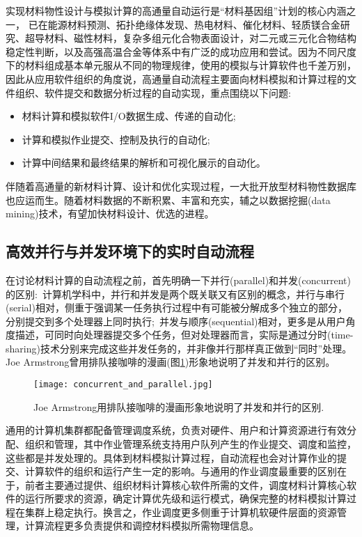 实现材料物性设计与模拟计算的高通量自动运行是“材料基因组”计划的核心内涵之一， 已在能源材料预测、拓扑绝缘体发现、热电材料、催化材料、轻质镁合金研究、超导材料、磁性材料，复杂多组元化合物表面设计，对二元或三元化合物结构稳定性判断，以及高强高温合金等体系中有广泛的成功应用和尝试。因为不同尺度下的材料组成基本单元服从不同的物理规律，使用的模拟与计算软件也千差万别，因此从应用软件组织的角度说，高通量自动流程主要面向材料模拟和计算过程的文件组织、软件提交和数据分析过程的自动实现，重点围绕以下问题:~
\begin{itemize}
	\item 材料计算和模拟软件\textrm{I/O}数据生成、传递的自动化;
	\item 计算和模拟作业提交、控制及执行的自动化;
	\item 计算中间结果和最终结果的解析和可视化展示的自动化。
\end{itemize}
伴随着高通量的新材料计算、设计和优化实现过程，一大批开放型材料物性数据库也应运而生。随着材料数据的不断积累、丰富和充实，辅之以数据挖掘(\textrm{data mining})技术，有望加快材料设计、优选的进程。

\subsection{高效并行与并发环境下的实时自动流程}
在讨论材料计算的自动流程之前，首先明确一下并行(\textrm{parallel})和并发(\textrm{concurrent})的区别:~计算机学科中，并行和并发是两个既关联又有区别的概念，并行与串行(\textrm{serial})相对，侧重于强调某一任务执行过程中有可能被分解成多个独立的部分，分别提交到多个处理器上同时执行;~并发与顺序(\textrm{sequential})相对，更多是从用户角度描述，可同时向处理器提交多个任务，但对处理器而言，实际是通过分时(\textrm{time-sharing})技术分别来完成这些并发任务的，并非像并行那样真正做到“同时”处理。\textrm{ Joe Armstrong}曾用排队接咖啡的漫画(图\ref{Fig:Current_and_Parallel})形象地说明了并发和并行的区别。
\begin{figure}[h!]
\centering
\texttt{[image: concurrent\_and\_parallel.jpg]}%
\caption{\textrm{Joe Armstrong}用排队接咖啡的漫画形象地说明了并发和并行的区别.}%
\label{Fig:Current_and_Parallel}
\end{figure}

通用的计算机集群都配备管理调度系统，负责对硬件、用户和计算资源进行有效分配、组织和管理，其中作业管理系统支持用户队列产生的作业提交、调度和监控，这些都是并发处理的。具体到材料模拟计算过程，自动流程也会对计算作业的提交、计算软件的组织和运行产生一定的影响。与通用的作业调度最重要的区别在于，前者主要通过提供、组织材料计算核心软件所需的文件，调度材料计算核心软件的运行所要求的资源，确定计算优先级和运行模式，确保完整的材料模拟计算过程在集群上稳定执行。换言之，作业调度更多侧重于计算机软硬件层面的资源管理，计算流程更多负责提供和调控材料模拟所需物理信息。

